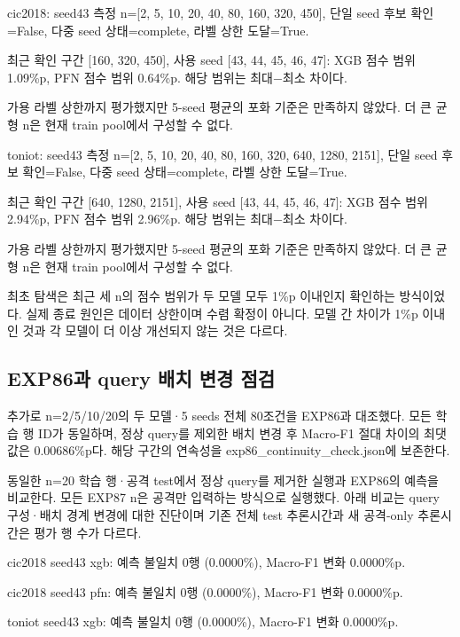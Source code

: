 cic2018: seed43 측정 n=\allowbreak{}[2, 5, 10, 20, 40, 80, 160, 320, 450], 단일 seed 후보 확인=\allowbreak{}False, 다중 seed 상태=\allowbreak{}complete, 라벨 상한 도달=\allowbreak{}True.

최근 확인 구간 [160, 320, 450], 사용 seed [43, 44, 45, 46, 47]: XGB 점수 범위 1.09\%p, PFN 점수 범위 0.64\%p. 해당 범위는 최대−최소 차이다.

가용 라벨 상한까지 평가했지만 5-seed 평균의 포화 기준은 만족하지 않았다. 더 큰 균형 n은 현재 train pool에서 구성할 수 없다.

toniot: seed43 측정 n=\allowbreak{}[2, 5, 10, 20, 40, 80, 160, 320, 640, 1280, 2151], 단일 seed 후보 확인=\allowbreak{}False, 다중 seed 상태=\allowbreak{}complete, 라벨 상한 도달=\allowbreak{}True.

최근 확인 구간 [640, 1280, 2151], 사용 seed [43, 44, 45, 46, 47]: XGB 점수 범위 2.94\%p, PFN 점수 범위 2.96\%p. 해당 범위는 최대−최소 차이다.

가용 라벨 상한까지 평가했지만 5-seed 평균의 포화 기준은 만족하지 않았다. 더 큰 균형 n은 현재 train pool에서 구성할 수 없다.

최초 탐색은 최근 세 n의 점수 범위가 두 모델 모두 1\%p 이내인지 확인하는 방식이었다. 실제 종료 원인은 데이터 상한이며 수렴 확정이 아니다. 모델 간 차이가 1\%p 이내인 것과 각 모델이 더 이상 개선되지 않는 것은 다르다.

\subsection{EXP86과 query 배치 변경 점검}
추가로 n=\allowbreak{}2/\allowbreak{}5/\allowbreak{}10/\allowbreak{}20의 두 모델·5 seeds 전체 80조건을 EXP86과 대조했다. 모든 학습 행 ID가 동일하며, 정상 query를 제외한 배치 변경 후 Macro-F1 절대 차이의 최댓값은 0.00686\%p다. 해당 구간의 연속성을 exp86\_\allowbreak{}continuity\_\allowbreak{}check.json에 보존한다.

동일한 n=\allowbreak{}20 학습 행·공격 test에서 정상 query를 제거한 실행과 EXP86의 예측을 비교한다. 모든 EXP87 n은 공격만 입력하는 방식으로 실행했다. 아래 비교는 query 구성·배치 경계 변경에 대한 진단이며 기존 전체 test 추론시간과 새 공격-only 추론시간은 평가 행 수가 다르다.

cic2018 seed43 xgb: 예측 불일치 0행 (0.0000\%), Macro-F1 변화 0.0000\%p.

cic2018 seed43 pfn: 예측 불일치 0행 (0.0000\%), Macro-F1 변화 0.0000\%p.

toniot seed43 xgb: 예측 불일치 0행 (0.0000\%), Macro-F1 변화 0.0000\%p.

